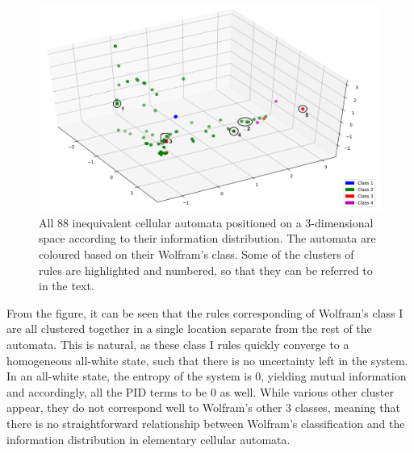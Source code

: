 \documentclass[12pt]{article}
\begin{document}
\begin{figure} [!h]
\begin{center}
\includegraphics[width=.9\textwidth]{eca-pid-characterization}
\caption{All 88 inequivalent cellular automata positioned on a 3-dimensional space according to their information distribution. The automata are coloured based on their Wolfram's class. Some of the clusters of rules are highlighted and numbered, so that they can be referred to in the text.}
\label{fig:eca-pid-char}
\end{center}
\end{figure}

From the figure, it can be seen that the rules corresponding of Wolfram's class I are all clustered together in a single location separate from the rest of the automata. This is natural, as these class I rules quickly converge to a homogeneous all-white state, such that there is no uncertainty left in the system. In an all-white state, the entropy of the system is 0, yielding mutual information and accordingly, all the PID terms to be 0 as well. While various other cluster appear, they do not correspond well to Wolfram's other 3 classes, meaning that there is no straightforward relationship between Wolfram's classification and the information distribution in elementary cellular automata. 
\end{document}
